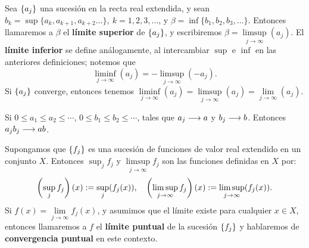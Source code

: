 \begin{defn}\label{dfcp3}Sea $\left\{a_{j}\right\}$ una sucesión en la recta
real extendida, y sean $b_k = \sup\{a_k,a_{k+1},a_{k+2}\dots\},\
k=1,2,3,\dots$, y $\beta = \inf\{b_1,b_2,b_3,\dots\}$. Entonces
llamaremos a $\beta$ el \textbf{límite superior} de $\left\{a_{j}\right\}$, y
escribiremos $\beta = \limsup \limits_{j\rightarrow \infty}(a_j)$.
El \textbf{límite inferior} se define análogamente, al intercambiar
$\sup$ e $\inf$ en las anteriores definiciones; notemos que \[\liminf
\limits_{j\rightarrow \infty}(a_j) = -\limsup \limits_{j\rightarrow
\infty}(-a_j).\] Si $\left\{a_{j}\right\}$ converge, entonces tenemos $\liminf
\limits_{j\rightarrow \infty}(a_j) = \limsup \limits_{j\rightarrow
\infty}(a_j) = \lim \limits_{j\rightarrow
\infty}(a_j)$.\end{defn}

\begin{prp}\label{prcp1}Si $0\leq a_1\leq a_2\leq \cdots$,
$0\leq b_1\leq b_2\leq \cdots$, tales que $a_j \longrightarrow a$ y $b_j \longrightarrow
b$. Entonces $a_j b_j \longrightarrow ab$.
\end{prp}

\begin{defn}\label{dfcp4}Supongamos que $\left\{f_{j}\right\}$ es una sucesión de
funciones de valor real extendido en un conjunto $X$. Entonces
$\sup_j f_j$ y $\limsup \limits_{j\rightarrow \infty} f_j$ son las
funciones definidas en $X$ por:
\[\left(\sup_j f_j\right)(x):= \sup_j(f_j(x)),\quad \left(\limsup
\limits_{j \rightarrow \infty} f_j\right)(x):= \limsup \limits_{j
\rightarrow \infty}(f_j(x)).\] Si $f(x)=\lim \limits_{j \rightarrow
\infty} f_j(x)$, y asumimos que el límite existe para cualquier
$x\in X$, entonces llamaremos a $f$ el \textbf{límite puntual} de la
sucesión $\left\{f_{j}\right\}$ y hablaremos de \textbf{convergencia puntual} en
este contexto.\end{defn}

